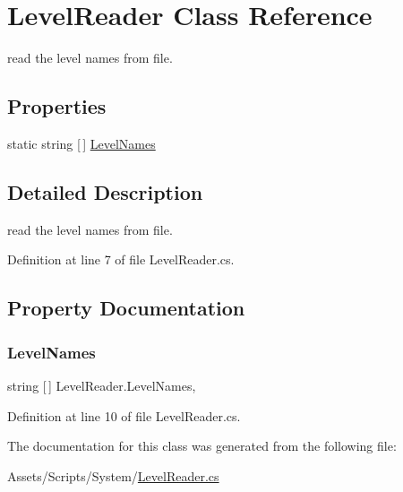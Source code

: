 \hypertarget{class_level_reader}{}\section{Level\+Reader Class Reference}
\label{class_level_reader}


read the level names from file.  


\subsection*{Properties}
\begin{DoxyCompactItemize}
\item 
static string \mbox{[}$\,$\mbox{]} \mbox{\hyperlink{class_level_reader_a08f55e38802b20704720fce291834359}{Level\+Names}}
\end{DoxyCompactItemize}


\subsection{Detailed Description}
read the level names from file. 



Definition at line 7 of file Level\+Reader.\+cs.



\subsection{Property Documentation}
\mbox{\label{class_level_reader_a08f55e38802b20704720fce291834359}} 
\subsubsection{\texorpdfstring{Level\+Names}{LevelNames}}
{\footnotesize\ttfamily string \mbox{[}$\,$\mbox{]} Level\+Reader.\+Level\+Names\hspace{0.3cm}{\ttfamily [static]}, {\ttfamily [get]}}



Definition at line 10 of file Level\+Reader.\+cs.



The documentation for this class was generated from the following file\+:\begin{DoxyCompactItemize}
\item 
Assets/\+Scripts/\+System/\mbox{\hyperlink{_level_reader_8cs}{Level\+Reader.\+cs}}\end{DoxyCompactItemize}
